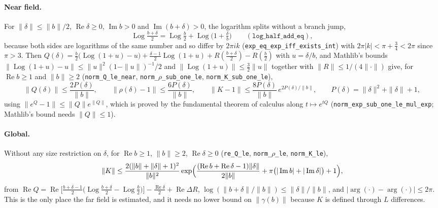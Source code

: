 \documentclass[11pt]{article}
\theoremstyle{definition}
\newcommand{\lean}[1]{\texttt{#1}}
\newcommand{\re}{\operatorname{Re}}
\newcommand{\im}{\operatorname{Im}}
\newcommand{\Log}{\operatorname{Log}}
\begin{document}
\paragraph{Near field.} For $\|\delta\| \le \|b\|/2$, $\re\delta \ge 0$, $\im b > 0$ and $\im(b+\delta) > 0$, the logarithm splits without a branch jump,
\[
\Log\tfrac{b+\delta}{2} = \Log\tfrac{b}{2} + \Log\bigl(1 + \tfrac{\delta}{b}\bigr)
\qquad(\lean{log\_half\_add\_eq}),
\]
because both sides are logarithms of the same number and so differ by $2\pi i k$ (\lean{exp\_eq\_exp\_iff\_exists\_int}) with $2\pi|k| < \pi + \tfrac34 < 2\pi$ since $\pi > 3$. Then $Q(\delta) = \tfrac{b}{2}\bigl(\Log(1+u) - u\bigr) + \tfrac{\delta-1}{2}\Log(1+u) + R(\tfrac{b+\delta}{2}) - R(\tfrac{b}{2})$ with $u = \delta/b$, and Mathlib's bounds $\|\Log(1+u) - u\| \le \|u\|^2(1-\|u\|)^{-1}/2$ and $\|\Log(1+u)\| \le \tfrac32\|u\|$ together with $\|R\| \le 1/(4\|\cdot\|)$ give, for $\re b \ge 1$ and $\|b\| \ge 2$ (\lean{norm\_Q\_le\_near}, \lean{norm\_$\rho$\_sub\_one\_le}, \lean{norm\_K\_sub\_one\_le}),
\[
\|Q(\delta)\| \le \frac{2P(\delta)}{\|b\|},\qquad \|\rho(\delta) - 1\| \le \frac{6P(\delta)}{\|b\|},\qquad
\|K - 1\| \le \frac{8P(\delta)}{\|b\|}\,e^{2P(\delta)/\|b\|},\qquad P(\delta) = \|\delta\|^2 + \|\delta\| + 1,
\]
using $\|e^{Q} - 1\| \le \|Q\|e^{\|Q\|}$, which is proved by the fundamental theorem of calculus along $t \mapsto e^{tQ}$ (\lean{norm\_exp\_sub\_one\_le\_mul\_exp}; Mathlib's bound needs $\|Q\| \le 1$).

\paragraph{Global.} Without any size restriction on $\delta$, for $\re b \ge 1$, $\|b\| \ge 2$, $\re\delta \ge 0$ (\lean{re\_Q\_le}, \lean{norm\_$\rho$\_le}, \lean{norm\_K\_le}),
\[
\|K\| \le \frac{2(\|b\| + \|\delta\| + 1)^2}{\|b\|^2}\exp\Bigl(\frac{(\re b + \re\delta - 1)\|\delta\|}{2\|b\|} + \pi\bigl(|\im b| + |\im\delta|\bigr) + 1\Bigr),
\]
from $\re Q = \re\bigl[\tfrac{b+\delta-1}{2}\bigl(\Log\tfrac{b+\delta}{2} - \Log\tfrac{b}{2}\bigr)\bigr] - \tfrac{\re\delta}{2} + \re\Delta R$, $\log(\|b+\delta\|/\|b\|) \le \|\delta\|/\|b\|$, and $|\arg(\cdot) - \arg(\cdot)| \le 2\pi$. This is the only place the far field is estimated, and it needs no lower bound on $\|\gamma(b)\|$ because $K$ is defined through $L$ differences.
\end{document}
